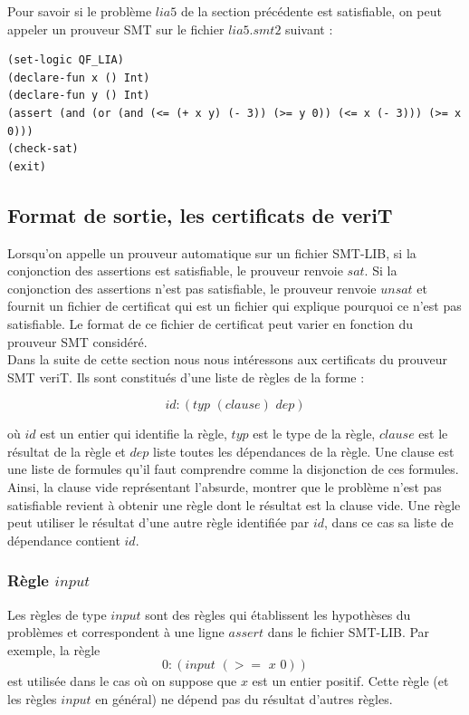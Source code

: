 \documentclass[11pt]{article}
\begin{document}
Pour savoir si le problème $lia5$ de la section précédente est satisfiable, on peut appeler un prouveur SMT sur le fichier $lia5.smt2$ suivant :
\begin{lstlisting}[frame=single]
(set-logic QF_LIA)
(declare-fun x () Int)
(declare-fun y () Int)
(assert (and (or (and (<= (+ x y) (- 3)) (>= y 0)) (<= x (- 3))) (>= x 0)))
(check-sat)
(exit)
\end{lstlisting}

\subsection{Format de sortie, les certificats de veriT} \label{sortie}

Lorsqu'on appelle un prouveur automatique sur un fichier SMT-LIB, si la conjonction des assertions est satisfiable, le prouveur renvoie $sat$. Si la conjonction des assertions n'est pas satisfiable, le prouveur renvoie $unsat$ et fournit un fichier de certificat qui est un fichier qui explique pourquoi ce n'est pas satisfiable. Le format de ce fichier de certificat peut varier en fonction du prouveur SMT considéré. \\


Dans la suite de cette section nous nous intéressons aux certificats du prouveur SMT veriT. Ils sont constitués d'une liste de règles de la forme : 

\[id:(typ \,\, (clause) \,\, dep)\]

où $id$ est un entier qui identifie la règle, $typ$ est le type de la règle, $clause$ est le résultat de la règle et $dep$ liste toutes les dépendances de la règle. Une clause est une liste de formules qu'il faut comprendre comme la disjonction de ces formules. Ainsi, la clause vide représentant l'absurde, montrer que le problème n'est pas satisfiable revient à obtenir une règle dont le résultat est la clause vide. Une règle peut utiliser le résultat d'une autre règle identifiée par $id$, dans ce cas sa liste de dépendance contient $id$.

\subsubsection{Règle $input$}

Les règles de type $input$ sont des règles qui établissent les hypothèses du problèmes et correspondent à une ligne $assert$ dans le fichier SMT-LIB. Par exemple, la règle 
\[ 0:(input \,\, (>= \,\,x \,\,0)) \]
est utilisée dans le cas où on suppose que $x$ est un entier positif. Cette règle (et les règles $input$ en général) ne dépend pas du résultat d'autres règles.\\
\end{document}

